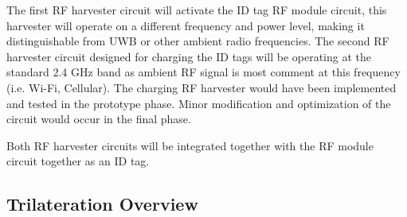 \bigskip
The first RF harvester circuit will activate the ID tag RF module circuit, this harvester will operate
on a different frequency and power level, making it distinguishable from UWB or other ambient radio frequencies. The second RF harvester circuit designed for charging the ID tags will be operating at the standard 2.4 GHz band  as ambient RF signal is most comment at this frequency (i.e. Wi-Fi, Cellular). The charging RF harvester would have been implemented and tested in the prototype phase. Minor modification and optimization of the circuit would occur in the final phase.

\bigskip
Both RF harvester circuits will be integrated together with the RF module circuit together as an ID tag.

\break
\subsection{Trilateration Overview}
\bigskip
